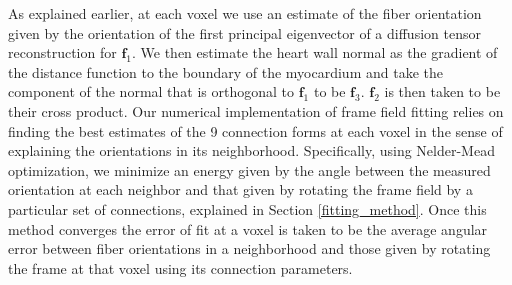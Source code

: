 As explained earlier, at each voxel we use an estimate of the fiber orientation given by the orientation of the first principal eigenvector of a diffusion tensor reconstruction for $\mathbf{f}_1$. We then estimate the heart wall normal as the gradient of the distance function to the boundary of the myocardium and take the component of the normal that is orthogonal to $\mathbf{f}_1$ to be $\mathbf{f}_3$. $\mathbf{f}_2$ is then taken to be their cross product. Our numerical implementation of frame field fitting relies on finding the best estimates of the 9 connection forms at each voxel in the sense of explaining the orientations in its neighborhood. Specifically, using Nelder-Mead optimization, we minimize an energy given by the angle between the measured orientation at each neighbor and that given by rotating the frame field by a particular set of connections, explained in Section \ref{fitting_method}. Once this method converges the error of fit at a voxel is taken to be the average angular error between fiber orientations in a neighborhood and those given by rotating the frame at that voxel using its connection parameters.